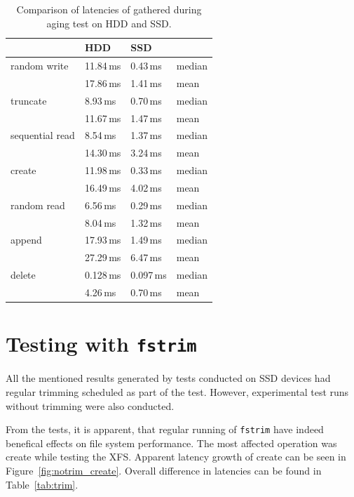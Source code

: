 \documentclass[
  color, %
  table, %
  lof,   %
  lot,   %
]{fithesis3}
\begin{document}
\begin{table}
\centering
\begin{tabular}{|l|l|l|l|}
\hline
 &HDD & SSD &  \\
\hline
    random write & 11.84\,ms & 0.43\,ms & median \\
 \hline
                 & 17.86\,ms & 1.41\,ms & mean\\
    \hline
        truncate & 8.93\,ms & 0.70\,ms & median\\
    \hline
                 & 11.67\,ms & 1.47\,ms & mean \\
    \hline
           sequential read & 8.54\,ms & 1.37\,ms & median\\
    \hline
                 & 14.30\,ms & 3.24\,ms & mean \\
    \hline
          create & 11.98\,ms & 0.33\,ms & median\\
    \hline
                 & 16.49\,ms & 4.02\,ms & mean \\
    \hline
     random read & 6.56\,ms & 0.29\,ms & median\\
    \hline
                 & 8.04\,ms & 1.32\,ms & mean \\
    \hline
          append & 17.93\,ms & 1.49\,ms & median\\
    \hline
                 & 27.29\,ms & 6.47\,ms & mean \\
    \hline
          delete & 0.128\,ms & 0.097\,ms & median\\
    \hline
                & 4.26\,ms & 0.70\,ms & mean \\
    \hline
\end{tabular}
\caption{Comparison of latencies of gathered during aging test on HDD and SSD.}
\label{tab:ssd_hdd_xfs}
\end{table}

\section{Testing with \texttt{fstrim}}
All the mentioned results generated by tests conducted on SSD devices had regular trimming scheduled as part of the test. However, experimental test runs without trimming were also conducted. 

From the tests, it is apparent, that regular running of \texttt{fstrim} have indeed benefical effects on file system performance. The most affected operation was create while testing the XFS. Apparent latency growth of create can be seen in Figure~\ref{fig:notrim_create}. Overall difference in latencies can be found in Table~\ref{tab:trim}.
\end{document}
